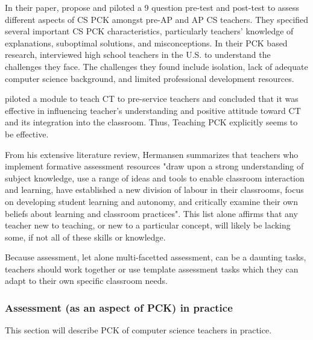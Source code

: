 In their paper,  propose and piloted a 9 question pre-test and post-test to assess different aspects of CS PCK amongst pre-AP and AP CS teachers. They specified several important CS PCK characteristics, particularly teachers' knowledge of explanations, suboptimal solutions, and misconceptions.  In their PCK based research,  interviewed high school teachers in the U.S. to understand the challenges they face. The challenges they found include isolation, lack of adequate computer science background, and limited professional development resources.

 piloted a module to teach CT to pre-service teachers and concluded that it was effective in influencing teacher's understanding and positive attitude toward CT and its integration into the classroom. Thus, Teaching PCK explicitly seems to be effective.







From his extensive literature review, Hermansen summarizes that teachers who implement formative assessment resources "draw upon a strong understanding of subject knowledge, use a range of ideas and tools to enable classroom interaction and learning, have established a new division of labour in their classrooms, focus on developing student learning and autonomy, and critically examine their own beliefs about learning and classroom practices". This list alone affirms that any teacher new to teaching, or new to a particular concept, will likely be lacking some, if not all of these skills or knowledge.


Because assessment, let alone multi-facetted assessment, can be a daunting tasks, teachers should work together or use template assessment tasks which they can adapt to their own specific classroom needs.



\subsubsection*{Assessment (as an aspect of PCK) in practice}
This section will describe PCK of computer science teachers in practice.

